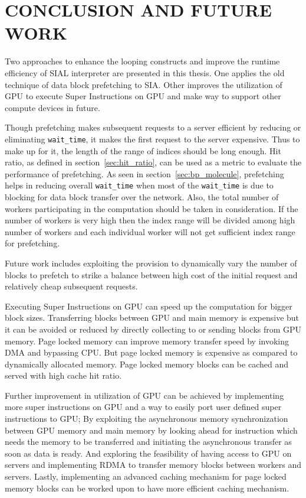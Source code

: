 \chapter{CONCLUSION AND FUTURE WORK}\label{conclusion}
Two approaches to enhance the looping constructs and improve the runtime efficiency
of SIAL interpreter are presented in this thesis. One applies the old technique of
data block prefetching to SIA. Other improves
the utilization of GPU to execute Super Instructions on GPU and make way to support
other compute devices in future.

Though prefetching makes subsequent requests to a server efficient by reducing or
eliminating \texttt{wait\_time}, it makes the first request to the server expensive.
Thus to make up for it, the length of the range of indices should be long enough. Hit
ratio, as defined in section~\ref{sec:hit_ratio}, can be used as a metric to evaluate
the performance of prefetching. As seen in section~\ref{sec:bp_molecule}, prefetching
helps in reducing overall \texttt{wait\_time} when most of the \texttt{wait\_time}
is due to blocking for data block transfer over the network. Also, the total number
of workers participating in the computation should be taken in consideration.
If the number of workers is very high then the index range will be divided among high number
of workers and each individual worker will not get sufficient index range for prefetching.

Future work includes exploiting the provision to dynamically vary the number of blocks
to prefetch to strike a balance between high cost of the initial request and relatively
cheap subsequent requests.

Executing Super Instructions on GPU can speed up the computation for bigger block
sizes. Transferring blocks between GPU and main memory is expensive but it can be
avoided or reduced by directly collecting to or sending blocks from GPU memory.
Page locked memory
can improve memory transfer speed by invoking DMA and bypassing CPU. But page locked
memory is expensive as compared to dynamically allocated memory. Page locked
memory blocks can be cached and served with high cache hit ratio.

Further improvement in utilization of GPU can be achieved by implementing more
super instructions on GPU and a way to easily port user defined super instructions
to GPU; By exploiting the asynchronous memory synchronization between GPU memory
and main memory by looking ahead for instruction which needs the memory
to be transferred and initiating the asynchronous transfer as soon as data is ready.
And exploring the feasibility of having access to GPU on servers and implementing
RDMA to transfer memory blocks between workers and servers. Lastly, implementing
an advanced caching mechanism for page locked memory blocks can be worked upon to have
more efficient caching mechanism.
